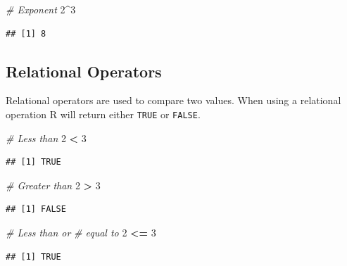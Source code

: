 \documentclass[
]{book}
\newenvironment{Shaded}{\begin{snugshade}}{\end{snugshade}}
\newcommand{\CommentTok}[1]{\textcolor[rgb]{0.56,0.35,0.01}{\textit{#1}}}
\newcommand{\DecValTok}[1]{\textcolor[rgb]{0.00,0.00,0.81}{#1}}
\newcommand{\OperatorTok}[1]{\textcolor[rgb]{0.81,0.36,0.00}{\textbf{#1}}}
\newcommand{\StringTok}[1]{\textcolor[rgb]{0.31,0.60,0.02}{#1}}
\begin{document}
\begin{Shaded}
\begin{Highlighting}[]
\CommentTok{# Exponent}
\DecValTok{2}\OperatorTok{^}\DecValTok{3}
\end{Highlighting}
\end{Shaded}

\begin{verbatim}
## [1] 8
\end{verbatim}

\hypertarget{relational-operators}{%
\subsection*{Relational Operators}\label{relational-operators}}

Relational operators are used to compare two values. When using a relational operation R will return either \texttt{TRUE} or \texttt{FALSE}.

\begin{Shaded}
\begin{Highlighting}[]
\CommentTok{# Less than}
\DecValTok{2} \OperatorTok{<}\StringTok{ }\DecValTok{3}
\end{Highlighting}
\end{Shaded}

\begin{verbatim}
## [1] TRUE
\end{verbatim}

\begin{Shaded}
\begin{Highlighting}[]
\CommentTok{# Greater than}
\DecValTok{2} \OperatorTok{>}\StringTok{ }\DecValTok{3}
\end{Highlighting}
\end{Shaded}

\begin{verbatim}
## [1] FALSE
\end{verbatim}

\begin{Shaded}
\begin{Highlighting}[]
\CommentTok{# Less than or}
\CommentTok{# equal to}
\DecValTok{2} \OperatorTok{<=}\StringTok{ }\DecValTok{3}
\end{Highlighting}
\end{Shaded}

\begin{verbatim}
## [1] TRUE
\end{verbatim}
\end{document}
